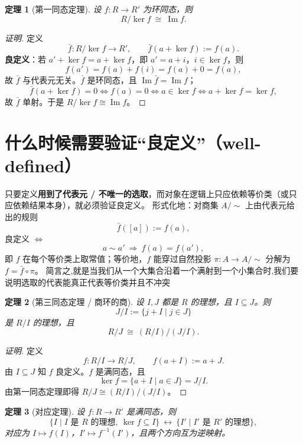 \documentclass[11pt,a4paper]{ctexart}
\newtheorem*{theorem}{定理}
\theoremstyle{remark}
\begin{document}
\begin{theorem}[第一同态定理]
设 $f:R\to R'$ 为环同态，则
\[
R/\ker f\ \cong\ \operatorname{Im}f .
\]
\end{theorem}

\begin{proof}[证明]
定义
\[
\bar f:R/\ker f\to R',\qquad \bar f(a+\ker f):=f(a).
\]
\textbf{良定义}：若 $a'+\ker f=a+\ker f$，即 $a'=a+i$，$i\in\ker f$，则
\[
f(a')=f(a)+f(i)=f(a)+0=f(a),
\]
故 $\bar f$ 与代表元无关。$\bar f$ 是环同态，且 $\operatorname{Im}\bar f=\operatorname{Im}f$；
\[
\bar f(a+\ker f)=0\iff f(a)=0\iff a\in\ker f\iff a+\ker f=\ker f,
\]
故 $\bar f$ 单射。于是 $R/\ker f\cong\operatorname{Im}f$。
\end{proof}

\begin{center}
\end{center}

\section*{什么时候需要验证“良定义”（well-defined）}

只要定义\textbf{用到了代表元 / 不唯一的选取}，而对象在逻辑上只应依赖等价类（或只应依赖结果本身），就必须验证良定义。
形式化地：对商集 $A/{\sim}$ 上由代表元给出的规则
\[
\bar f([a]):=f(a),
\]
良定义 $\iff$
\[
a\sim a'\ \Longrightarrow\ f(a)=f(a'),
\]
即 $f$ 在每个等价类上取常值；等价地，$f$ 能穿过自然投影 $\pi:A\to A/{\sim}$ 分解为 $f=\bar f\circ\pi$。
简言之,就是当我们从一个大集合沿着一个满射到一个小集合时,我们要说明选取的代表能真正代表等价类并且不冲突

\begin{theorem}[第三同态定理 / 商环的商]
设 $I,J$ 都是 $R$ 的理想，且 $I\subseteq J$。则
\[
J/I:=\{j+I\mid j\in J\}
\]
是 $R/I$ 的理想，且
\[
R/J\ \cong\ (R/I)\big/(J/I).
\]
\end{theorem}

\begin{proof}[证明]
定义
\[
f:R/I\to R/J,\qquad f(a+I):=a+J .
\]
由 $I\subseteq J$ 知 $f$ 良定义。$f$ 是满同态，且
\[
\ker f=\{a+I\mid a\in J\}=J/I .
\]
由第一同态定理即得 $R/J\cong(R/I)/(J/I)$。
\end{proof}

\begin{theorem}[对应定理]
设 $f:R\to R'$ 是满同态，则
\[
\{I\mid I \text{ 是 } R \text{ 的理想},\ \ker f\subseteq I\}\ \longleftrightarrow\ \{I'\mid I' \text{ 是 } R' \text{ 的理想}\},
\]
对应为 $I\mapsto f(I)$，$I'\mapsto f^{-1}(I')$，且两个方向互为逆映射。
\end{theorem}
\end{document}
